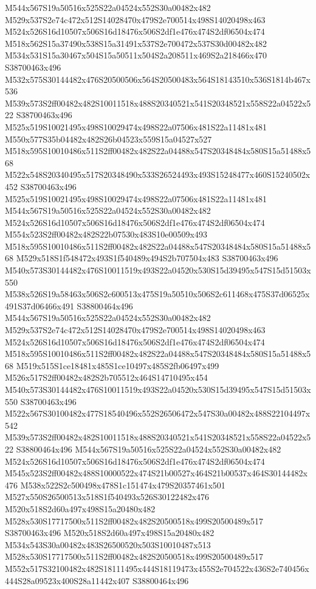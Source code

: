 \documentclass{article}
\begin{document}
\begin{multicols}{2}
M544x567S19a50516x525S22a04524x552S30a00482x482 M529x537S2e74c472x512S14028470x479S2e700514x498S14020498x463 M524x526S16d10507x506S16d18476x506S2df1e476x474S2df06504x474 M518x562S15a37490x538S15a31491x537S2e700472x537S30d00482x482 M534x531S15a30467x504S15a50511x504S2a208511x469S2a218466x470 S38700463x496 M532x575S30144482x476S20500506x564S20500483x564S18143510x536S1814b467x536 M539x573S2ff00482x482S10011518x488S20340521x541S20348521x558S22a04522x522 S38700463x496 M525x519S10021495x498S10029474x498S22a07506x481S22a11481x481 M550x577S35b04482x482S26b04523x559S15a04527x527 M518x595S10010486x511S2ff00482x482S22a04488x547S20348484x580S15a51488x568 M522x548S20340495x517S20348490x533S26524493x493S15248477x460S15240502x452 S38700463x496 M525x519S10021495x498S10029474x498S22a07506x481S22a11481x481 M544x567S19a50516x525S22a04524x552S30a00482x482 M524x526S16d10507x506S16d18476x506S2df1e476x474S2df06504x474 M554x523S2ff00482x482S22b07530x483S10e00509x493 M518x595S10010486x511S2ff00482x482S22a04488x547S20348484x580S15a51488x568 M529x518S1f548472x493S1f540489x494S2b707504x483 S38700463x496 M540x573S30144482x476S10011519x493S22a04520x530S15d39495x547S15d51503x550 M538x526S19a58463x506S2c600513x475S19a50510x506S2c611468x475S37d06525x491S37d06466x491 S38800464x496 M544x567S19a50516x525S22a04524x552S30a00482x482 M529x537S2e74c472x512S14028470x479S2e700514x498S14020498x463 M524x526S16d10507x506S16d18476x506S2df1e476x474S2df06504x474 M518x595S10010486x511S2ff00482x482S22a04488x547S20348484x580S15a51488x568 M519x515S1ce18481x485S1ce10497x485S2fb06497x499 M526x517S2ff00482x482S2b705512x464S14710495x454 M540x573S30144482x476S10011519x493S22a04520x530S15d39495x547S15d51503x550 S38700463x496 M522x567S30100482x477S18540496x552S26506472x547S30a00482x488S22104497x542 M539x573S2ff00482x482S10011518x488S20340521x541S20348521x558S22a04522x522 S38800464x496 M544x567S19a50516x525S22a04524x552S30a00482x482 M524x526S16d10507x506S16d18476x506S2df1e476x474S2df06504x474 M545x523S2ff00482x488S10000522x474S21b00527x464S21b00537x464S30144482x476 M538x522S2c500498x478S1c151474x479S20357461x501 M527x550S26500513x518S1f540493x526S30122482x476 M520x518S2d60a497x498S15a20480x482 M528x530S17717500x511S2ff00482x482S20500518x499S20500489x517 S38700463x496 M520x518S2d60a497x498S15a20480x482 M534x543S30a00482x483S26500520x503S10010487x513 M528x530S17717500x511S2ff00482x482S20500518x499S20500489x517 M552x517S32100482x482S18111495x444S18119473x455S2e704522x436S2e740456x444S28a09523x400S28a11442x407 S38800464x496


\end{multicols}
\end{document}
